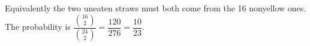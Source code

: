 Equivalently the two uneaten straws must both come from the 16 nonyellow ones. The probability is $\dfrac{\binom{16}{2}}{\binom{24}{2}}=\dfrac{120}{276}=\boxed{\dfrac{10}{23}}$.
